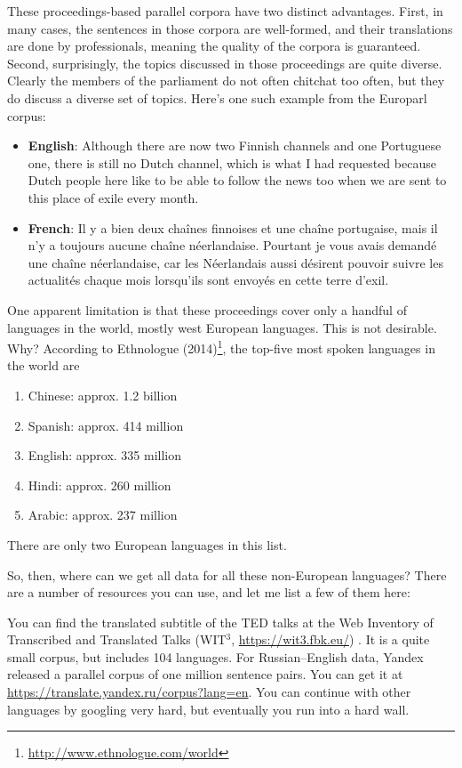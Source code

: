 \documentclass{report}
\begin{document}
These proceedings-based parallel corpora have two distinct advantages. First,
in many cases, the sentences in those corpora are well-formed, and their
translations are done by professionals, meaning the quality of the corpora is
guaranteed. Second, surprisingly, the topics discussed in those proceedings are
quite diverse. Clearly the members of the parliament do not often chitchat too
often, but they do discuss a diverse set of topics. Here's one such example from
the Europarl corpus:
\begin{itemize}
    \itemsep 0em
    \item \textbf{English}: 
        Although there are now two Finnish channels and one Portuguese one, there is
        still no Dutch channel, which is what I had requested because Dutch people here
        like to be able to follow the news too when we are sent to this place of exile
        every month.
    \item \textbf{French}: 
        Il y a bien deux chaînes finnoises et une chaîne portugaise, mais il n'y a
        toujours aucune chaîne néerlandaise. Pourtant je vous avais demand\'e une chaîne
        n\'eerlandaise, car les Néerlandais aussi désirent pouvoir suivre les actualités
        chaque mois lorsqu'ils sont envoyés en cette terre d'exil.
\end{itemize}

One apparent limitation is that these proceedings cover only a handful of
languages in the world, mostly west European languages. This is not desirable.
Why? According to Ethnologue (2014)\footnote{
    \url{http://www.ethnologue.com/world}
}, the top-five most spoken languages in the world are
\begin{enumerate}
    \itemsep 0em
    \item Chinese: approx. 1.2 billion
    \item Spanish: approx. 414 million
    \item English: approx. 335 million
    \item Hindi: approx. 260 million
    \item Arabic: approx. 237 million
\end{enumerate}
There are only two European languages in this list.

So, then, where can we get all data for all these non-European languages? There
are a number of resources you can use, and let me list a few of them here:

You can find the translated subtitle of the TED talks at the Web Inventory of
Transcribed and Translated Talks (WIT$^3$, \url{https://wit3.fbk.eu/})
\citep{cettoloEtAl:EAMT2012}. It is a quite small corpus, but includes 104
languages. For Russian--English data, Yandex released a parallel corpus of one
million sentence pairs. You can get it at
\url{https://translate.yandex.ru/corpus?lang=en}. You can continue with other
languages by googling very hard, but eventually you run into a hard wall.
\end{document}
